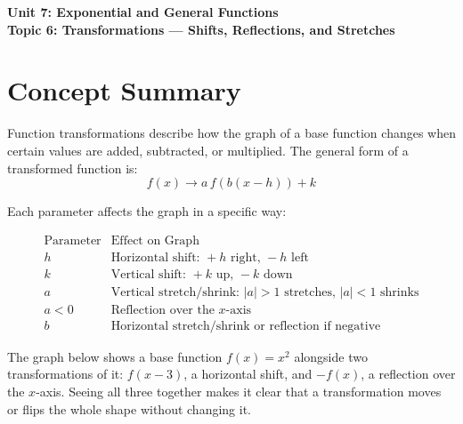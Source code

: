 \documentclass[14pt]{extarticle}
\begin{document}
\raggedright
{}

\begin{center}
    \LARGE \textbf{Unit 7: Exponential and General Functions} \\[6pt]
    \Large \textbf{Topic 6: Transformations — Shifts, Reflections, and Stretches}
\end{center}

\vspace{1em}

\section*{Concept Summary}

Function transformations describe how the graph of a base function changes when certain values are added, subtracted, or multiplied.  
The general form of a transformed function is:
\[
f(x) \rightarrow a\,f(b(x - h)) + k
\]

Each parameter affects the graph in a specific way:

\[
\begin{array}{c|l}
\text{Parameter} & \text{Effect on Graph} \\ \hline
h & \text{Horizontal shift: } +h \text{ right, } -h \text{ left} \\
k & \text{Vertical shift: } +k \text{ up, } -k \text{ down} \\
a & \text{Vertical stretch/shrink: } |a|>1 \text{ stretches, } |a|<1 \text{ shrinks} \\
a<0 & \text{Reflection over the } x\text{-axis} \\
b & \text{Horizontal stretch/shrink or reflection if negative}
\end{array}
\]

The graph below shows a base function \(f(x) = x^2\) alongside two transformations of it: \(f(x - 3)\), a horizontal shift, and \(-f(x)\), a reflection over the \(x\)-axis. Seeing all three together makes it clear that a transformation moves or flips the whole shape without changing it.

\end{document}

